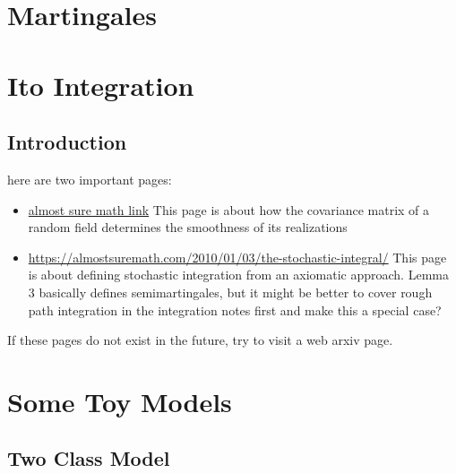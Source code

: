 \documentclass{book}
\begin{document}
	
	
	
	
	
	
	
	
	\newpage
	\chapter{Martingales}
	
	
	
	\newpage
	\chapter{Ito Integration}
	
	\section{Introduction}
	
	here are two important pages:
	\begin{itemize}
		\item \href{https://almostsuremath.com/2020/10/20/the-kolmogorov-continuity-theorem/#more-3304}{almost sure math link} This page is about how the covariance matrix of a random field determines the smoothness of its realizations
		\item \href{https://almostsuremath.com/2010/01/03/the-stochastic-integral/}{https://almostsuremath.com/2010/01/03/the-stochastic-integral/}
		This page is about defining stochastic integration from an axiomatic approach. Lemma 3 basically defines semimartingales, but it might be better to cover rough path integration in the integration notes first and make this a special case?
	\end{itemize}
	If these pages do not exist in the future, try to visit a web arxiv page. 
	
	
	
	
	
	
	
	
	
	
	
	
	\chapter{Some Toy Models}
	
	\section{Two Class Model}
	
\end{document}
